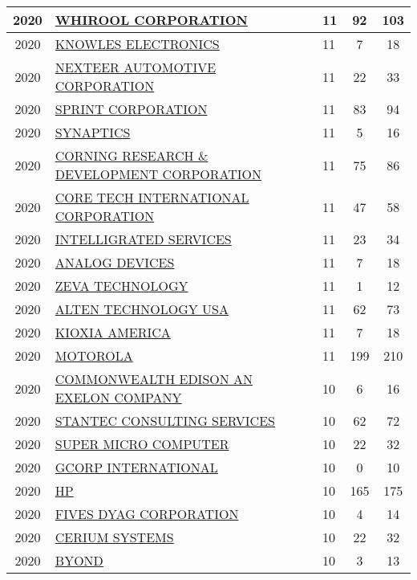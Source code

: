 \documentclass{article}%
\begin{document}
\begin{longtable}{c|p{20em}|p{5em}|c|c}
\hline%
2020&\hyperref[subsec:WHIROOLCORPORATION]{WHIROOL CORPORATION}&11&92&103\\%
\hline%
2020&\hyperref[subsec:KNOWLESELECTRONICS]{KNOWLES ELECTRONICS}&11&7&18\\%
\hline%
2020&\hyperref[subsec:NEXTEERAUTOMOTIVECORPORATION]{NEXTEER AUTOMOTIVE CORPORATION}&11&22&33\\%
\hline%
2020&\hyperref[subsec:SPRINTCORPORATION]{SPRINT CORPORATION}&11&83&94\\%
\hline%
2020&\hyperref[subsec:SYNAPTICS]{SYNAPTICS}&11&5&16\\%
\hline%
2020&\hyperref[subsec:CORNINGRESEARCHDEVELOPMENTCORPORATION]{CORNING RESEARCH \& DEVELOPMENT CORPORATION}&11&75&86\\%
\hline%
2020&\hyperref[subsec:CORETECHINTERNATIONALCORPORATION]{CORE TECH INTERNATIONAL CORPORATION}&11&47&58\\%
\hline%
2020&\hyperref[subsec:INTELLIGRATEDSERVICES]{INTELLIGRATED SERVICES}&11&23&34\\%
\hline%
2020&\hyperref[subsec:ANALOGDEVICES]{ANALOG DEVICES}&11&7&18\\%
\hline%
2020&\hyperref[subsec:ZEVATECHNOLOGY]{ZEVA TECHNOLOGY}&11&1&12\\%
\hline%
2020&\hyperref[subsec:ALTENTECHNOLOGYUSA]{ALTEN TECHNOLOGY USA}&11&62&73\\%
\hline%
2020&\hyperref[subsec:KIOXIAAMERICA]{KIOXIA AMERICA}&11&7&18\\%
\hline%
2020&\hyperref[subsec:MOTOROLA]{MOTOROLA}&11&199&210\\%
\hline%
2020&\hyperref[subsec:COMMONWEALTHEDISONANEXELONCOMPANY]{COMMONWEALTH EDISON AN EXELON COMPANY}&10&6&16\\%
\hline%
2020&\hyperref[subsec:STANTECCONSULTINGSERVICES]{STANTEC CONSULTING SERVICES}&10&62&72\\%
\hline%
2020&\hyperref[subsec:SUPERMICROCOMPUTER]{SUPER MICRO COMPUTER}&10&22&32\\%
\hline%
2020&\hyperref[subsec:GCORPINTERNATIONAL]{GCORP INTERNATIONAL}&10&0&10\\%
\hline%
2020&\hyperref[subsec:HP]{HP}&10&165&175\\%
\hline%
2020&\hyperref[subsec:FIVESDYAGCORPORATION]{FIVES DYAG CORPORATION}&10&4&14\\%
\hline%
2020&\hyperref[subsec:CERIUMSYSTEMS]{CERIUM SYSTEMS}&10&22&32\\%
\hline%
2020&\hyperref[subsec:BYOND]{BYOND}&10&3&13\\%
\hline%

\end{longtable}
\end{document}

